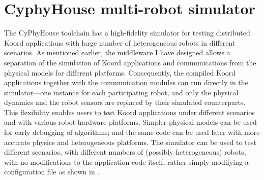 \section{CyphyHouse multi-robot simulator}
\label{sec:simulator}
The CyPhyHouse toolchain has a high-fidelity simulator for testing distributed Koord applications with large number of heterogeneous robots in different scenarios.
%
As mentioned earlier, the middleware I have designed allows a separation of the simulation of Koord applications and communications from the physical models for different platforms. Consequently, the compiled Koord applications together with the communication modules can run directly in the simulator---one instance for each participating robot, and only the physical dynamics and the robot sensors are replaced by their simulated counterparts. This flexibility enables users to test Koord applications under different scenarios and with various robot hardware platforms. Simpler physical models can be used for early debugging of algorithms; and the same code can be used later with more accurate physics and heterogeneous platforms.
%
The simulator can be used to test different scenarios, with different numbers of (possibly heterogeneous) robots,
with no modifications to the application code itself, rather simply modifying a configuration file as shown in .

